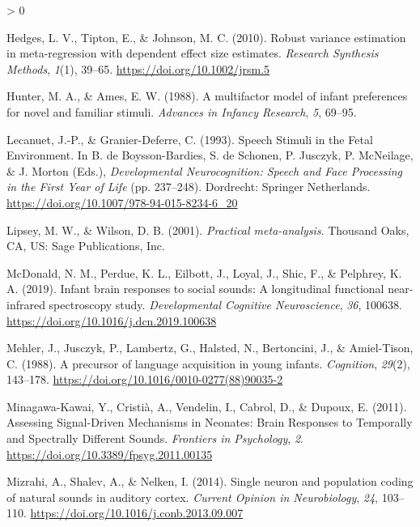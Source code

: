 \documentclass[
  english,
  man]{apa6}
\newlength{\cslhangindent}
\newenvironment{CSLReferences}[2] %
 {%
  \setlength{\parindent}{0pt}
  \ifodd #1 \everypar{\setlength{\hangindent}{\cslhangindent}}\ignorespaces\fi
  \ifnum #2 > 0
  \setlength{\parskip}{#2\baselineskip}
  \fi
 }%
 {}
\begin{document}
\begin{CSLReferences}{1}{0}
\leavevmode\hypertarget{ref-hedges_robust_2010}{}%
Hedges, L. V., Tipton, E., \& Johnson, M. C. (2010). Robust variance estimation in meta-regression with dependent effect size estimates. \emph{Research Synthesis Methods}, \emph{1}(1), 39--65. \url{https://doi.org/10.1002/jrsm.5}

\leavevmode\hypertarget{ref-hunter_multifactor_1988}{}%
Hunter, M. A., \& Ames, E. W. (1988). A multifactor model of infant preferences for novel and familiar stimuli. \emph{Advances in Infancy Research}, \emph{5}, 69--95.

\leavevmode\hypertarget{ref-lecanuet_speech_1993}{}%
Lecanuet, J.-P., \& Granier-Deferre, C. (1993). Speech {Stimuli} in the {Fetal} {Environment}. In B. de Boysson-Bardies, S. de Schonen, P. Jusczyk, P. McNeilage, \& J. Morton (Eds.), \emph{Developmental {Neurocognition}: {Speech} and {Face} {Processing} in the {First} {Year} of {Life}} (pp. 237--248). Dordrecht: Springer Netherlands. \url{https://doi.org/10.1007/978-94-015-8234-6_20}

\leavevmode\hypertarget{ref-lipsey_practical_2001}{}%
Lipsey, M. W., \& Wilson, D. B. (2001). \emph{Practical meta-analysis}. Thousand Oaks, CA, US: Sage Publications, Inc.

\leavevmode\hypertarget{ref-mcdonald_infant_2019}{}%
McDonald, N. M., Perdue, K. L., Eilbott, J., Loyal, J., Shic, F., \& Pelphrey, K. A. (2019). Infant brain responses to social sounds: {A} longitudinal functional near-infrared spectroscopy study. \emph{Developmental Cognitive Neuroscience}, \emph{36}, 100638. \url{https://doi.org/10.1016/j.dcn.2019.100638}

\leavevmode\hypertarget{ref-mehler_precursor_1988}{}%
Mehler, J., Jusczyk, P., Lambertz, G., Halsted, N., Bertoncini, J., \& Amiel-Tison, C. (1988). A precursor of language acquisition in young infants. \emph{Cognition}, \emph{29}(2), 143--178. \url{https://doi.org/10.1016/0010-0277(88)90035-2}

\leavevmode\hypertarget{ref-minagawa-kawai_assessing_2011}{}%
Minagawa-Kawai, Y., Cristià, A., Vendelin, I., Cabrol, D., \& Dupoux, E. (2011). Assessing {Signal}-{Driven} {Mechanisms} in {Neonates}: {Brain} {Responses} to {Temporally} and {Spectrally} {Different} {Sounds}. \emph{Frontiers in Psychology}, \emph{2}. \url{https://doi.org/10.3389/fpsyg.2011.00135}

\leavevmode\hypertarget{ref-mizrahi_single_2014}{}%
Mizrahi, A., Shalev, A., \& Nelken, I. (2014). Single neuron and population coding of natural sounds in auditory cortex. \emph{Current Opinion in Neurobiology}, \emph{24}, 103--110. \url{https://doi.org/10.1016/j.conb.2013.09.007}


\end{CSLReferences}
\end{document}
